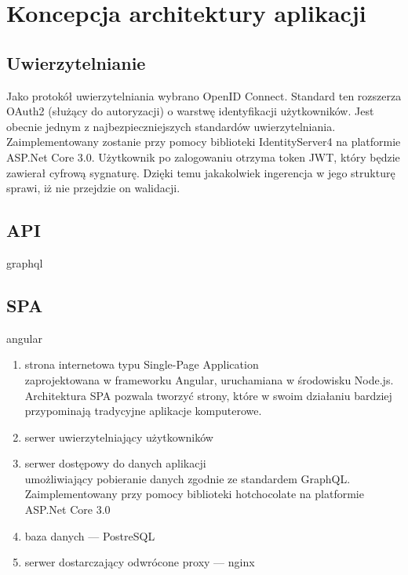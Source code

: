 \section{Koncepcja architektury aplikacji}
	\subsection{Uwierzytelnianie}
		Jako protokół uwierzytelniania wybrano OpenID Connect.
		Standard ten rozszerza OAuth2 (służący do autoryzacji) o warstwę identyfikacji użytkowników.
		Jest obecnie jednym z najbezpieczniejszych standardów uwierzytelniania.
		Zaimplementowany zostanie przy pomocy biblioteki IdentityServer4 na platformie ASP.Net Core 3.0.
		Użytkownik po zalogowaniu otrzyma token JWT, który będzie zawierał cyfrową sygnaturę.
		Dzięki temu jakakolwiek ingerencja w jego strukturę sprawi, iż nie przejdzie on walidacji.

	\subsection{API}
		graphql
	\subsection{SPA}
		angular

		\begin{enumerate}
			\item strona internetowa typu Single-Page Application\\
				zaprojektowana w frameworku Angular, uruchamiana w środowisku Node.js.
				Architektura SPA pozwala tworzyć strony, które w swoim działaniu bardziej przypominają tradycyjne aplikacje komputerowe.
				
			\item serwer uwierzytelniający użytkowników\\
			\item serwer dostępowy do danych aplikacji\\
				umożliwiający pobieranie danych zgodnie ze standardem GraphQL.
				Zaimplementowany przy pomocy biblioteki hotchocolate na platformie ASP.Net Core 3.0
			\item baza danych --- PostreSQL
			\item serwer dostarczający odwrócone proxy --- nginx
		\end{enumerate}


